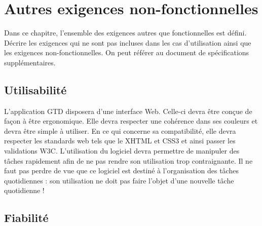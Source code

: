 
















\chapter{Autres exigences non-fonctionnelles}

Dans ce chapitre, l'ensemble des exigences autres que fonctionnelles est défini. 
Décrire les exigences qui ne sont pas incluses dans les cas d’utilisation ainsi que les exigences non-fonctionnelles. On peut référer au document de spécifications supplémentaires.






	\section{Utilisabilité} 		
	

	L'application GTD disposera d'une interface Web. Celle-ci devra être conçue de façon à être ergonomique. Elle devra respecter une cohérence dans ses couleurs et devra être simple à utiliser. En ce qui concerne sa compatibilité, elle devra respecter les standards web tels que le XHTML et CSS3 et ainsi passer les validations W3C. L'utilisation du logiciel devra permettre de manipuler des tâches rapidement afin de ne pas rendre son utilisation trop contraignante. Il ne faut pas perdre de vue que ce logiciel est destiné à l'organisation des tâches quotidiennes : son utilisation ne doit pas faire l'objet d'une nouvelle tâche quotidienne !
	
	
	
	
	\section{Fiabilité }
	

